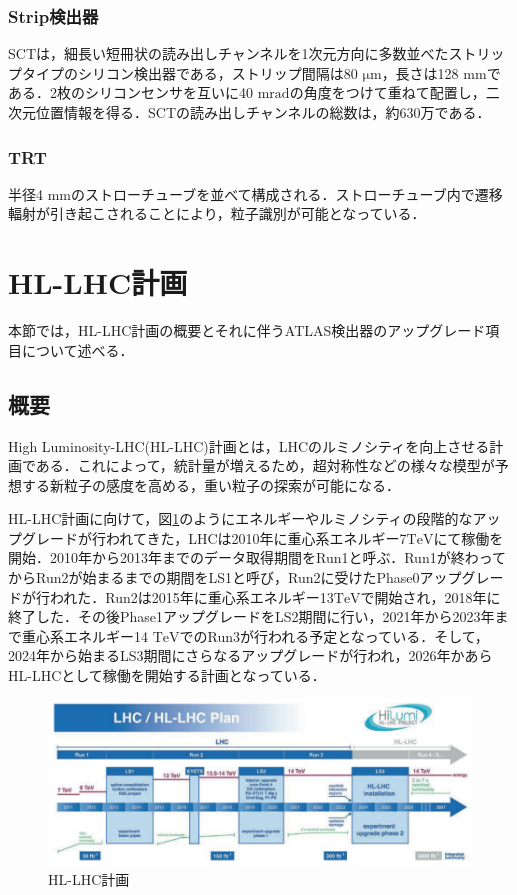 \subsubsection*{Strip検出器}
SCTは，細長い短冊状の読み出しチャンネルを1次元方向に多数並べたストリップタイプのシリコン検出器である，ストリップ間隔は80 $\mathrm{\mu m}$，長さは128 $\mathrm{mm}$である．2枚のシリコンセンサを互いに40 $\mathrm{mrad}$の角度をつけて重ねて配置し，二次元位置情報を得る．SCTの読み出しチャンネルの総数は，約630万である．

\subsubsection*{TRT}
半径4 $\mathrm{mm}$のストローチューブを並べて構成される．ストローチューブ内で遷移輻射が引き起こされることにより，粒子識別が可能となっている．

\section{HL-LHC計画}
\label{sec:HL-LHC}
本節では，HL-LHC計画の概要とそれに伴うATLAS検出器のアップグレード項目について述べる．\par

\subsection{概要}
High Luminosity-LHC(HL-LHC)計画とは，LHCのルミノシティを向上させる計画である．これによって，統計量が増えるため，超対称性などの様々な模型が予想する新粒子の感度を高める，重い粒子の探索が可能になる．\par
HL-LHC計画に向けて，図\ref{fig:HL-LHC}のようにエネルギーやルミノシティの段階的なアップグレードが行われてきた，LHCは2010年に重心系エネルギー7$\mathrm{TeV}$にて稼働を開始．2010年から2013年までのデータ取得期間をRun1と呼ぶ．Run1が終わってからRun2が始まるまでの期間をLS1と呼び，Run2に受けたPhase0アップグレードが行われた．Run2は2015年に重心系エネルギー13$\mathrm{TeV}$で開始され，2018年に終了した．その後Phase1アップグレードをLS2期間に行い，2021年から2023年まで重心系エネルギー14 $\mathrm{TeV}$でのRun3が行われる予定となっている．そして，2024年から始まるLS3期間にさらなるアップグレードが行われ，2026年かあらHL-LHCとして稼働を開始する計画となっている．

\begin{figure}[h]
  \centering
  \includegraphics[width=15cm]{./figure/HL_LHC.png}
  \caption{HL-LHC計画\cite{Apollinari:2284929}}
  \label{fig:HL-LHC}
\end{figure}



